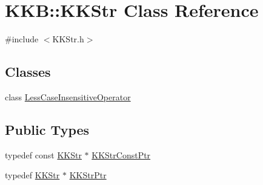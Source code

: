 \hypertarget{class_k_k_b_1_1_k_k_str}{}\section{K\+KB\+:\+:K\+K\+Str Class Reference}
\label{class_k_k_b_1_1_k_k_str}


{\ttfamily \#include $<$K\+K\+Str.\+h$>$}

\subsection*{Classes}
\begin{DoxyCompactItemize}
\item 
class \hyperlink{class_k_k_b_1_1_k_k_str_1_1_less_case_insensitive_operator}{Less\+Case\+Insensitive\+Operator}
\end{DoxyCompactItemize}
\subsection*{Public Types}
\begin{DoxyCompactItemize}
\item 
typedef const \hyperlink{class_k_k_b_1_1_k_k_str}{K\+K\+Str} $\ast$ \hyperlink{class_k_k_b_1_1_k_k_str_af0b636488a4f7497e5f65a576ccb55c8}{K\+K\+Str\+Const\+Ptr}
\item 
typedef \hyperlink{class_k_k_b_1_1_k_k_str}{K\+K\+Str} $\ast$ \hyperlink{class_k_k_b_1_1_k_k_str_a00d1f5cb2d6cf913893365a11cb6057c}{K\+K\+Str\+Ptr}
\end{DoxyCompactItemize}
